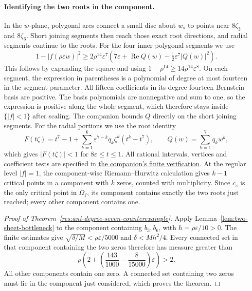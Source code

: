\documentclass[11pt]{article}
\newcommand{\recordlink}[3]{\href{#1\##2}{#3}}
\begin{document}
\paragraph{Identifying the two roots in the component.}
In the $w$-plane, polygonal arcs connect a small disc about $w_s$ to
points near $8\zeta_3$ and $8\zeta_6$. Short joining segments then
reach those exact root directions, and radial segments continue to the
roots. For the four inner polygonal segments we use
\[
 1-|f(\rho\varepsilon w)|^2\ge
 2\rho^{14}\varepsilon^7
 \left(7\varepsilon+\operatorname{Re}Q(w)
                       -\tfrac12\varepsilon^7|Q(w)|^2\right).
\]
This follows by expanding the square and using
$1-\rho^{14}\ge14\rho^{14}\varepsilon^8$.
On each segment, the expression in parentheses is a polynomial of degree
at most fourteen in the segment parameter. All fifteen coefficients in
its degree-fourteen Bernstein basis are positive. The basis polynomials
are nonnegative and sum to one, so the expression is positive along the
whole segment, which therefore stays inside $\{|f|<1\}$ after scaling.
The companion bounds $Q$ directly on the short joining segments.
For the radial portions we use the root identity
\[
 F(t\zeta)=t^7-1+
       \sum_{k=1}^6\varepsilon^{7-k}q_k\zeta^k(t^k-t^7),
 \qquad Q(w)=\sum_{k=1}^7q_kw^k,
\]
which gives $|F(t\zeta)|<1$ for $8\varepsilon\le t\le1$.
All rational intervals, vertices and coefficient tests are specified in
\recordlink{erdos1041-lemniscate-reasoning-surface.pdf}{counterexample-certificate}
{the companion's finite verification}. At the regular level $|f|=1$,
the component-wise Riemann--Hurwitz calculation
\cite[proof of Proposition~2.1]{eks2010} gives $k-1$ critical points
in a component with $k$ zeros, counted with multiplicity. Since $c_s$
is the only critical point in $\Omega_f$, its component contains
exactly the two roots just reached; every other component contains one.


\begin{proof}[Proof of Theorem~\ref{res:ani-degree-seven-counterexample}]
Apply Lemma~\ref{lem:two-sheet-bottleneck} to the component containing
$b_3,b_6$, with $h=\rho\varepsilon/10>0$. The finite estimates give
$\sqrt{\delta/M}<\rho\varepsilon/5000$ and
$\delta<Mh^2/4$. Every connected set in that component containing the
two zeros therefore has measure greater than
\[
 \rho\left(2+\left(\frac{143}{1000}-\frac8{15000}\right)
                        \varepsilon\right)>2.
\]
All other components contain one zero. A connected set containing two
zeros must lie in the component just considered, which proves the theorem.
\end{proof}
\end{document}
